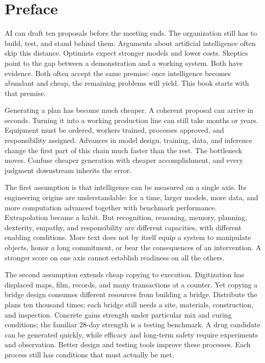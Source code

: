 \chapter*{Preface}

AI can draft ten proposals before the meeting ends. The organization still has to build, test, and stand behind them. Arguments about artificial intelligence often skip this distance. Optimists expect stronger models and lower costs. Skeptics point to the gap between a demonstration and a working system. Both have evidence. Both often accept the same premise: once intelligence becomes abundant and cheap, the remaining problems will yield. This book starts with that premise.

Generating a plan has become much cheaper. A coherent proposal can arrive in seconds. Turning it into a working production line can still take months or years. Equipment must be ordered, workers trained, processes approved, and responsibility assigned. Advances in model design, training, data, and inference change the first part of this chain much faster than the rest. The bottleneck moves. Confuse cheaper generation with cheaper accomplishment, and every judgment downstream inherits the error.

The first assumption is that intelligence can be measured on a single axis. Its engineering origins are understandable: for a time, larger models, more data, and more computation advanced together with benchmark performance. Extrapolation became a habit. But recognition, reasoning, memory, planning, dexterity, empathy, and responsibility are different capacities, with different enabling conditions. More text does not by itself equip a system to manipulate objects, honor a long commitment, or bear the consequences of an intervention. A stronger score on one axis cannot establish readiness on all the others.

The second assumption extends cheap copying to execution. Digitization has displaced maps, film, records, and many transactions at a counter. Yet copying a bridge design consumes different resources from building a bridge. Distribute the plans ten thousand times; each bridge still needs a site, materials, construction, and inspection. Concrete gains strength under particular mix and curing conditions; the familiar 28-day strength is a testing benchmark. A drug candidate can be generated quickly, while efficacy and long-term safety require experiments and observation. Better design and testing tools improve these processes. Each process still has conditions that must actually be met.

